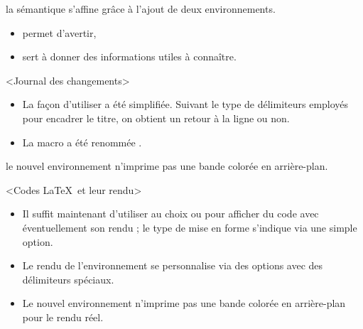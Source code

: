 

\begin{bdoctopic}
    la sémantique s'affine grâce à l'ajout de deux environnements.

    \begin{itemize}
        \item {} permet d'avertir,

        \item {} sert à donner des informations utiles à connaître.
    \end{itemize}
\end{bdoctopic}




\begin{bdoctopic}<Journal des changements>
    \begin{itemize}
        \item La façon d'utiliser  a été simplifiée. Suivant le type de délimiteurs employés pour encadrer le titre, on obtient un retour à la ligne ou non.

        \item La macro  a été renommée .
    \end{itemize}
\end{bdoctopic}




\begin{bdoctopic}
    le nouvel environnement  n'imprime pas une bande colorée en arrière-plan.
\end{bdoctopic}




\begin{bdoctopic}<Codes \LaTeX\ et leur rendu>
    \begin{itemize}
        \item Il suffit maintenant d'utiliser au choix  ou  pour afficher du code avec éventuellement son rendu ; le type de mise en forme s'indique via une simple option.

        \item Le rendu de l'environnement  se personnalise via des options avec des délimiteurs spéciaux.

        \item Le nouvel environnement  n'imprime pas une bande colorée en arrière-plan pour le rendu réel.
    \end{itemize}
\end{bdoctopic}


